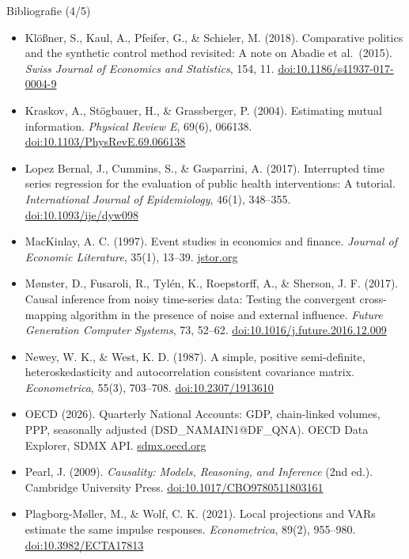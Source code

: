 \begin{frame}{Bibliografie (4/5)}
\itemsize{\tiny}
\begin{itemize}
    \item Klößner, S., Kaul, A., Pfeifer, G., \& Schieler, M. (2018). Comparative politics and the synthetic control method revisited: A note on Abadie et al.\ (2015). \textit{Swiss Journal of Economics and Statistics}, 154, 11. \href{https://doi.org/10.1186/s41937-017-0004-9}{doi:10.1186/s41937-017-0004-9}
    \item Kraskov, A., Stögbauer, H., \& Grassberger, P. (2004). Estimating mutual information. \textit{Physical Review E}, 69(6), 066138. \href{https://doi.org/10.1103/PhysRevE.69.066138}{doi:10.1103/PhysRevE.69.066138}
    \item Lopez Bernal, J., Cummins, S., \& Gasparrini, A. (2017). Interrupted time series regression for the evaluation of public health interventions: A tutorial. \textit{International Journal of Epidemiology}, 46(1), 348--355. \href{https://doi.org/10.1093/ije/dyw098}{doi:10.1093/ije/dyw098}
    \item MacKinlay, A. C. (1997). Event studies in economics and finance. \textit{Journal of Economic Literature}, 35(1), 13--39. \href{https://www.jstor.org/stable/2729691}{jstor.org}
    \item Mønster, D., Fusaroli, R., Tylén, K., Roepstorff, A., \& Sherson, J. F. (2017). Causal inference from noisy time-series data: Testing the convergent cross-mapping algorithm in the presence of noise and external influence. \textit{Future Generation Computer Systems}, 73, 52--62. \href{https://doi.org/10.1016/j.future.2016.12.009}{doi:10.1016/j.future.2016.12.009}
    \item Newey, W. K., \& West, K. D. (1987). A simple, positive semi-definite, heteroskedasticity and autocorrelation consistent covariance matrix. \textit{Econometrica}, 55(3), 703--708. \href{https://doi.org/10.2307/1913610}{doi:10.2307/1913610}
    \item OECD (2026). Quarterly National Accounts: GDP, chain-linked volumes, PPP, seasonally adjusted (DSD\_NAMAIN1@DF\_QNA). OECD Data Explorer, SDMX API. \href{https://sdmx.oecd.org/public/rest/dataflow/OECD.SDD.NAD/DSD_NAMAIN1@DF_QNA/1.1}{sdmx.oecd.org}
    \item Pearl, J. (2009). \textit{Causality: Models, Reasoning, and Inference} (2nd ed.). Cambridge University Press. \href{https://doi.org/10.1017/CBO9780511803161}{doi:10.1017/CBO9780511803161}
    \item Plagborg-Møller, M., \& Wolf, C. K. (2021). Local projections and VARs estimate the same impulse responses. \textit{Econometrica}, 89(2), 955--980. \href{https://doi.org/10.3982/ECTA17813}{doi:10.3982/ECTA17813}

\end{itemize}
\end{frame}
